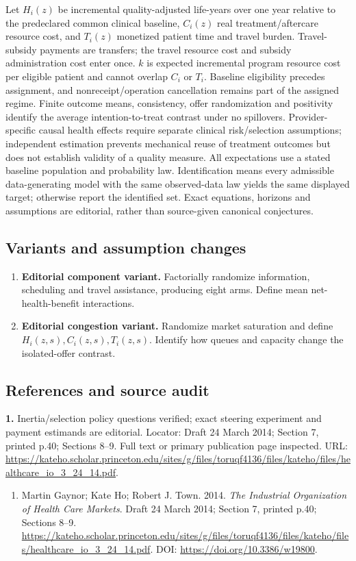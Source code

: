 \documentclass[11pt,a4paper]{article}
\begin{document}
Let \(H_i(z)\) be incremental quality-adjusted life-years over one year relative to the predeclared common clinical baseline, \(C_i(z)\) real treatment/aftercare resource cost, and \(T_i(z)\) monetized patient time and travel burden. Travel-subsidy payments are transfers; the travel resource cost and subsidy administration cost enter once. \(k\) is expected incremental program resource cost per eligible patient and cannot overlap \(C_i\) or \(T_i\). Baseline eligibility precedes assignment, and nonreceipt/operation cancellation remains part of the assigned regime. Finite outcome means, consistency, offer randomization and positivity identify the average intention-to-treat contrast under no spillovers. Provider-specific causal health effects require separate clinical risk/selection assumptions; independent estimation prevents mechanical reuse of treatment outcomes but does not establish validity of a quality measure. All expectations use a stated baseline population and probability law. Identification means every admissible data-generating model with the same observed-data law yields the same displayed target; otherwise report the identified set. Exact equations, horizons and assumptions are editorial, rather than source-given canonical conjectures.
\subsection*{Variants and assumption changes}
\begin{enumerate}
\item \textbf{Editorial component variant.} Factorially randomize information, scheduling and travel assistance, producing eight arms. Define mean net-health-benefit interactions.
\item \textbf{Editorial congestion variant.} Randomize market saturation and define \(H_i(z,s),\allowbreak C_i(z,s),\allowbreak T_i(z,s)\). Identify how queues and capacity change the isolated-offer contrast.
\end{enumerate}
\subsection*{References and source audit}
\textbf{1.} Inertia/selection policy questions verified; exact steering experiment and payment estimands are editorial. Locator: Draft 24 March 2014; Section 7, printed p.40; Sections 8–9. Full text or primary publication page inspected. URL: \url{https://kateho.scholar.princeton.edu/sites/g/files/toruqf4136/files/kateho/files/healthcare_io_3_24_14.pdf}.
\begin{enumerate}\raggedright
\item\hypertarget{definitions:source:30007726:1}{} Martin Gaynor; Kate Ho; Robert J. Town. 2014. \emph{The Industrial Organization of Health Care Markets}. Draft 24 March 2014; Section 7, printed p.40; Sections 8–9.
\url{https://kateho.scholar.princeton.edu/sites/g/files/toruqf4136/files/kateho/files/healthcare_io_3_24_14.pdf}.
DOI: \url{https://doi.org/10.3386/w19800}.
\end{enumerate}
\end{document}
